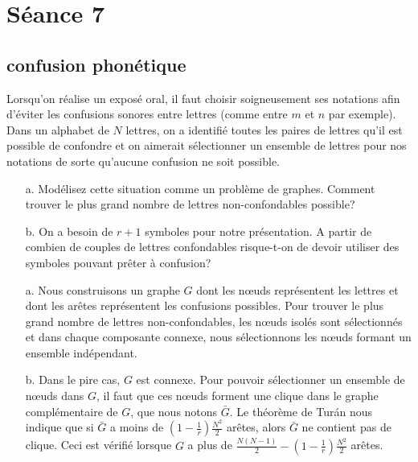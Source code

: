 %

\section{Séance 7}

\subsection{confusion phonétique}
Lorsqu'on réalise un exposé oral, il faut choisir soigneusement ses notations afin d'éviter les confusions sonores entre lettres (comme entre $m$ et $n$ par exemple). Dans un alphabet de $N$ lettres, on a identifié toutes les paires de lettres qu'il est possible de confondre et on aimerait sélectionner un ensemble de lettres pour nos notations de sorte qu'aucune confusion ne soit possible.

\begin{enumerate}
  \item[a.] Modélisez cette situation comme un problème de graphes. Comment trouver le plus grand nombre de lettres non-confondables possible?
  \item[b.] On a besoin de $r+1$ symboles pour notre présentation. A partir de combien de couples de lettres confondables risque-t-on de devoir utiliser des symboles pouvant prêter à confusion?
\end{enumerate}

\begin{solution}
\begin{enumerate}
\item[a.]
Nous construisons un graphe $G$ dont les nœuds représentent les lettres et dont les arêtes représentent les confusions possibles. Pour trouver le plus grand nombre de lettres non-confondables, les nœuds isolés sont sélectionnés et dans chaque composante connexe, nous sélectionnons les nœuds formant un ensemble indépendant.

\item[b.]
Dans le pire cas, $G$ est connexe. Pour pouvoir sélectionner un ensemble de nœuds dans $G$, il faut que ces nœuds forment une clique dans le graphe complémentaire de $G$, que nous notons $\bar{G}$. Le théorème de Turán nous indique que si $\bar{G}$ a moins de $\left(1-\frac{1}{r}\right)\frac{N^2}{2}$ arêtes, alors $\bar{G}$ ne contient pas de clique. Ceci est vérifié lorsque $G$ a plus de $\frac{N(N-1)}{2}-\left(1-\frac{1}{r}\right)\frac{N^2}{2}$ arêtes.

\end{enumerate}
\end{solution}

